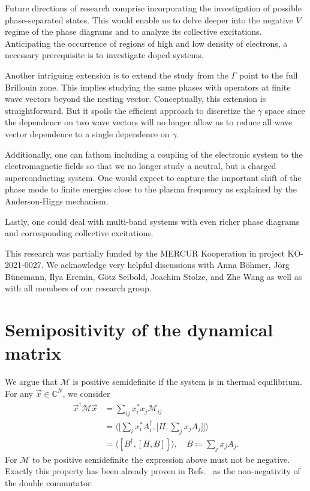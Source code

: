 \documentclass[
    reprint, 
    aps,
    preprintnumbers,
    twocolumn,
    prb,
    superscriptaddress
]{revtex4-2}
\newcommand{\mM}{\mathcal{M}}
\newcommand{\bs}{\begin{subequations}}
\newcommand{\es}{\end{subequations}}
\begin{document}

Future directions of research comprise incorporating the investigation of possible phase-separated states. 
This would enable us to delve deeper into the negative $V$ regime 
of the phase diagrams and to analyze its collective excitations. Anticipating the occurrence
of regions of high and low density of electrons, a necessary prerequisite is to investigate doped systems.

Another intriguing extension is to extend the study from the $\Gamma$ point to the full Brillouin zone.
This implies studying the same phases with operators at finite wave vectors beyond the nesting vector. 
Conceptually, this extension is straightforward. But it spoils the efficient approach
to discretize the $\gamma$ space since the dependence on two wave vectors will no longer
allow us to reduce all wave vector dependence to a single dependence on $\gamma$.

Additionally, one can fathom including a coupling of the electronic system to the electromagnetic fields
so that we no longer study a neutral, but a charged superconducting system. One would expect
to capture the important shift of the phase mode to finite energies close to the plasma frequency 
as explained by the Anderson-Higgs mechanism.

Lastly, one could deal with multi-band systems with even richer phase
diagrams and corresponding collective excitations. 


\begin{acknowledgments} 
	This research was partially funded by the MERCUR Kooperation
		in project KO-2021-0027. We acknowledge very helpful discussions with
		Anna B\"ohmer, J\"org B\"unemann, Ilya Eremin, G\"otz Seibold, Joachim Stolze, and Zhe Wang
		as well as with all members of our research group.
\end{acknowledgments}


\appendix
\section{Semipositivity of the dynamical matrix}
\label{sec:positive_M}

We argue that $\mathcal{M}$ is positive semidefinite if the system is in thermal equilibrium.
For any $\vec{x} \in \mathbb{C}^N$, we consider
\bs
\begin{align}
    \vec{x}^\dagger \mM \vec{x} &= \sum_{ij} x_i^* x_j \mM_{ij} 
		\\
        &= \Big\langle \Big[ \sum_i x_i^* A_i^\dagger, \Big[ H, \sum_j x_j A_j \Big] \Big]  \Big\rangle 
				\\
        &= \langle [B^\dagger, [H, B]] \rangle,\quad B \coloneqq  \sum_j x_j A_j.
\end{align}
\es
For $\mM$ to be positive semidefinite the expression above must not be negative.
Exactly this property has been already proven in Refs.\ \cite{mermin66,Dyson1978}
as the non-negativity of the double commutator.
\end{document}

